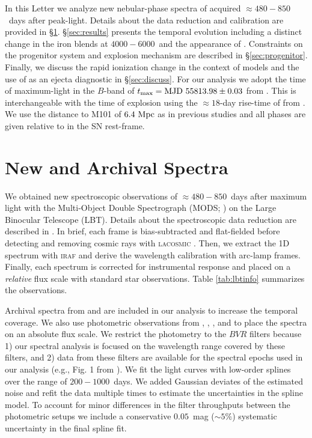\documentclass[twocolumn]{aastex63}
\begin{document}
In this Letter we analyze new nebular-phase spectra of \name acquired $\approx 480-850$~days after peak-light. Details about the data reduction and calibration are provided in \S\ref{sec:data}. \S\ref{sec:results} presents the temporal evolution including a distinct change in the iron blends at $4000-6000$~\AAA and the appearance of \CaII. Constraints on the progenitor system and explosion mechanism are described in \S\ref{sec:progenitor}. Finally, we discuss the rapid ionization change in the context of \snia models and the use of \CaII as an ejecta diagnostic in \S\ref{sec:discuss}. For our analysis we adopt the time of maximum-light in the $B$-band of $t_{\rm{max}} = \rm{MJD}~55813.98\pm0.03$ from \citet{zhang2016}. This is interchangeable with the time of explosion using the $\approx 18$-day rise-time of \name from \citet{pereira2013}. We use the distance to M101 of $6.4~\rm{Mpc}$ \citep{shappee2011} as in previous studies and all phases are given relative to \tmax in the SN rest-frame.


\section{New and Archival Spectra}\label{sec:data}



We obtained new spectroscopic observations of \name $\approx 480-850$~days after maximum light with the Multi-Object Double Spectrograph (MODS; \citealp{pogge2010}) on the Large Binocular Telescope (LBT). Details about the spectroscopic data reduction are described in \citet{shappee2013}. In brief, each frame is bias-subtracted and flat-fielded before detecting and removing cosmic rays with \textsc{lacosmic} \citep{vandokkum2001}. Then, we extract the 1D spectrum with \textsc{iraf} and derive the wavelength calibration with arc-lamp frames. Finally, each spectrum is corrected for instrumental response and placed on a \textit{relative} flux scale with standard star observations. Table \ref{tab:lbtinfo} summarizes the observations. 

Archival spectra from \citet{shappee2013, graham2015a, graham2015b, taubenberger2015, mazzali2015} and \citet{zhang2016} are included in our analysis to increase the temporal coverage. We also use photometric observations from \citet{munari2013}, \citet{tsvetkov2013}, \citet{zhang2016}, and \citet{shappee2017} to place the spectra on an absolute flux scale. We restrict the photometry to the $BVR$ filters because 1) our spectral analysis is focused on the wavelength range covered by these filters, and 2) data from these filters are available for the spectral epochs used in our analysis (e.g., Fig. 1 from \citealp{tucker2021c}). We fit the light curves with low-order splines over the range of $200-1000$~days. We added Gaussian deviates of the estimated noise and refit the data multiple times to estimate the uncertainties in the spline model. To account for minor differences in the filter throughputs between the photometric setups we include a conservative $0.05$~mag ($\sim 5\%$) systematic uncertainty in the final spline fit. 
\end{document}
